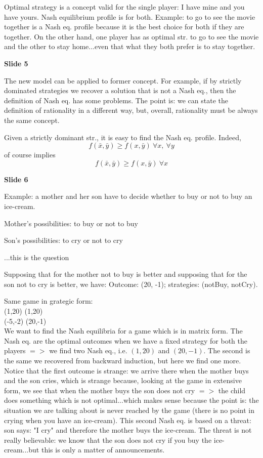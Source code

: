 \documentclass[pt11,a4paper,twoside,reqno,openright]{paper}
\begin{document}
\noindent Optimal strategy is a concept valid for the single player: I 
have mine and you have yours. Nash equilibrium profile is for both. Example: 
to go to see the movie together is a Nash eq. profile because it is 
the best choice for both if they are together. On the other hand, one 
player has as optimal str. to go to see the movie and the other to 
stay home...even that what they both prefer is to stay together.

\bigskip
\noindent \textbf{Slide 5}

\noindent The new model can be applied to former concept. For example, 
if by strictly dominated strategies we recover a solution that is not 
a Nash eq., then the definition of Nash eq. has some problems. The point 
is: we can state the definition of rationality in a different way, but, 
overall, rationality must be always the same concept.

\noindent Given a strictly dominant str., it is easy to find the Nash 
eq. profile. Indeed,
\[
	f(\bar{x},\bar{y}) \geq f(x,\bar{y}) ~\forall x,~\forall y
\]
of course implies
\[
	f(\bar{x},\bar{y}) \geq f(x,\bar{y}) ~\forall x
\]

\bigskip
\noindent \textbf{Slide 6}

\noindent Example: a mother and her son have to decide whether to 
buy or not to buy an ice-cream.

\noindent Mother's possibilities: to buy or not to buy

\noindent Son's possibilities: to cry or not to cry

\noindent ...this is the question

\noindent Supposing that for the mother not to buy is better and 
supposing that for the son not to cry is better, we have: 
Outcome: (20, -1); strategies: (notBuy, notCry).

\noindent Same game in grategic form:\\
(1,20)	(1,20)\\
(-5,-2)	(20,-1)\\

\noindent We want to find the Nash equilibria for a game which is in 
matrix form. The Nash eq. are the optimal outcomes when we have a fixed 
strategy for both the players $=>$ we find two Nash eq., i.e. $(1,20)$ 
and $(20,-1)$. The second is the same we recovered from backward 
induction, but here we find one more. Notice that the first outcome is 
strange: we arrive there when the mother buys and the son cries, which 
is strange because, looking at the game in extensive form, we see that 
when the mother buys the son does not cry $=>$ the child does something 
which is not optimal...which makes sense because the point is: the 
situation we are talking about is never reached by the game (there is 
no point in crying when you have an ice-cream). This second Nash eq. is 
based on a threat: son says: "I cry" and therefore the mother buys the 
ice-cream. The threat is not really believable: we know that the son 
does not cry if you buy the ice-cream...but this is only a matter of 
announcements.
\end{document}
